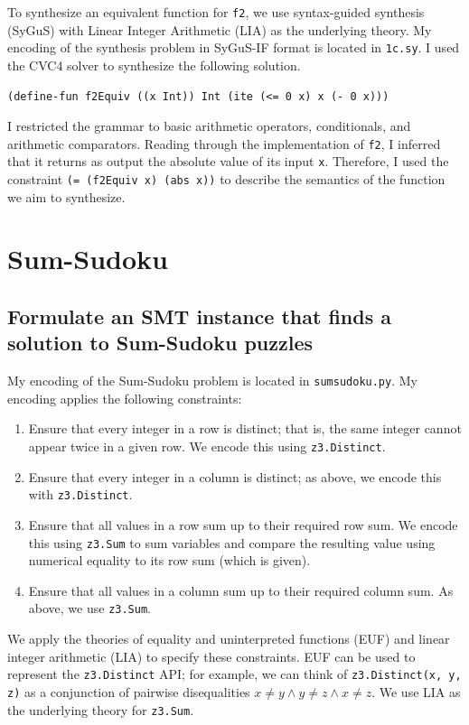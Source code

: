 \documentclass{article}
\newcommand{\code}[1]{\texttt{#1}}
\begin{document}
To synthesize an equivalent function for \code{f2}, we use syntax-guided synthesis (SyGuS) with Linear Integer Arithmetic (LIA) as the underlying theory. My encoding of the synthesis problem in SyGuS-IF format is located in \code{1c.sy}. I used the CVC4 solver to synthesize the following solution.

\begin{lstlisting}
(define-fun f2Equiv ((x Int)) Int (ite (<= 0 x) x (- 0 x)))
\end{lstlisting}

I restricted the grammar to basic arithmetic operators, conditionals, and arithmetic comparators. Reading through the implementation of \code{f2}, I inferred that it returns as output the absolute value of its input \code{x}. Therefore, I used the constraint \code{(= (f2Equiv x) (abs x))} to describe the semantics of the function we aim to synthesize.

\section{Sum-Sudoku}

\subsection{Formulate an SMT instance that finds a solution to Sum-Sudoku puzzles}

My encoding of the Sum-Sudoku problem is located in \code{sumsudoku.py}. My encoding applies the following constraints:

\begin{enumerate}
  \item Ensure that every integer in a row is distinct; that is, the same integer cannot appear twice in a given row. We encode this using \code{z3.Distinct}.
  \item Ensure that every integer in a column is distinct; as above, we encode this with \code{z3.Distinct}.
  \item Ensure that all values in a row sum up to their required row sum. We encode this using \code{z3.Sum} to sum variables and compare the resulting value using numerical equality to its row sum (which is given).
  \item Ensure that all values in a column sum up to their required column sum. As above, we use \code{z3.Sum}.
\end{enumerate}

We apply the theories of equality and uninterpreted functions (EUF) and linear integer arithmetic (LIA) to specify these constraints. EUF can be used to represent the \code{z3.Distinct} API; for example, we can think of \code{z3.Distinct(x, y, z)} as a conjunction of pairwise disequalities $x \neq y \land y \neq z \land x \neq z$. We use LIA as the underlying theory for \code{z3.Sum}.
\end{document}
